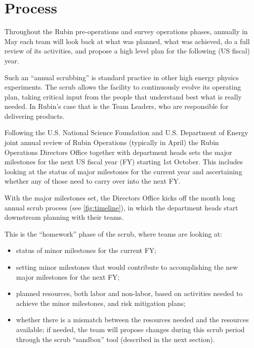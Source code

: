 \section{Process} \label{sec:process}

Throughout the Rubin pre-operations and survey operations phases, annually in May each team will look back at what was planned, what was achieved, do a full review of its activities, and propose a high level plan for the following (US fiscal) year.

Such an ``annual scrubbing'' is standard practice in other high energy physics experiments. 
The scrub allows the facility to continuously evolve its operating plan, taking critical input from the people that understand best what is really needed. 
In Rubin’s case that is the Team Leaders, who are responsible for delivering products.

Following the U.S. National Science Foundation and U.S. Department of Energy joint annual review of Rubin Operations (typically in April) the Rubin Operations Directors Office together with department heads sets the major milestones for the next US fiscal year (FY) starting 1st October. 
This includes looking at the status of major milestones for the current year and ascertaining whether any of those need to carry over into the next FY.

With the major milestones set, the Directors Office kicks off the month long annual scrub process (see \autoref{fig:timeline}), in which the department heads start downstream planning with their teams. 

This is the ``homework'' phase of the scrub, where teams are looking at:
\begin{itemize}
\item status of minor milestones for the current FY;
\item setting minor milestones that would contribute to accomplishing the new major milestones for the next FY;
\item planned resources, both labor and non-labor, based on activities needed to achieve the minor milestones, and risk mitigation plans;
\item whether there is a mismatch between the resources needed and the resources available; if needed, the team will propose changes during this scrub period through the scrub ``sandbox'' tool (described in the next section).
\end{itemize}


